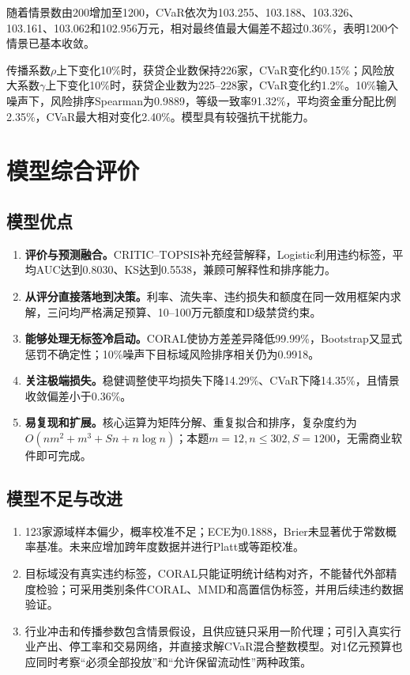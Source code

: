\documentclass[UTF8,a4paper,12pt,fontset=fandol]{ctexart}
\numberwithin{equation}{section}
\begin{document}
随着情景数由200增加至1200，CVaR依次为103.255、103.188、103.326、103.161、103.062和102.956万元，相对最终值最大偏差不超过0.36\%，表明1200个情景已基本收敛。

传播系数$\rho$上下变化10\%时，获贷企业数保持226家，CVaR变化约0.15\%；风险放大系数$\gamma$上下变化10\%时，获贷企业数为225--228家，CVaR变化约1.2\%。10\%输入噪声下，风险排序Spearman为0.9889，等级一致率91.32\%，平均资金重分配比例2.35\%，CVaR最大相对变化2.40\%。模型具有较强抗干扰能力。

\section{模型综合评价}

\subsection{模型优点}

\begin{enumerate}
  \item \textbf{评价与预测融合。}CRITIC--TOPSIS补充经营解释，Logistic利用违约标签，平均AUC达到0.8030、KS达到0.5538，兼顾可解释性和排序能力。
  \item \textbf{从评分直接落地到决策。}利率、流失率、违约损失和额度在同一效用框架内求解，三问均严格满足预算、10--100万元额度和D级禁贷约束。
  \item \textbf{能够处理无标签冷启动。}CORAL使协方差差异降低99.99\%，Bootstrap又显式惩罚不确定性；10\%噪声下目标域风险排序相关仍为0.9918。
  \item \textbf{关注极端损失。}稳健调整使平均损失下降14.29\%、CVaR下降14.35\%，且情景收敛偏差小于0.36\%。
  \item \textbf{易复现和扩展。}核心运算为矩阵分解、重复拟合和排序，复杂度约为$O(nm^2+m^3+Sn+n\log n)$；本题$m=12,n\le302,S=1200$，无需商业软件即可完成。
\end{enumerate}

\subsection{模型不足与改进}

\begin{enumerate}
  \item 123家源域样本偏少，概率校准不足；ECE为0.1888，Brier未显著优于常数概率基准。未来应增加跨年度数据并进行Platt或等距校准。
  \item 目标域没有真实违约标签，CORAL只能证明统计结构对齐，不能替代外部精度检验；可采用类别条件CORAL、MMD和高置信伪标签，并用后续违约数据验证。
  \item 行业冲击和传播参数包含情景假设，且供应链只采用一阶代理；可引入真实行业产出、停工率和交易网络，并直接求解CVaR混合整数模型。对1亿元预算也应同时考察“必须全部投放”和“允许保留流动性”两种政策。
\end{enumerate}
\end{document}
